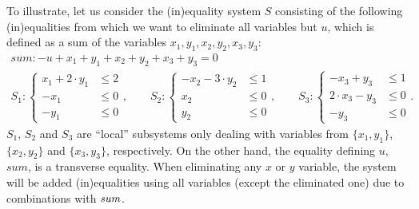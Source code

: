 \begin{example}\label{ex:1}
To illustrate, let us consider the (in)equality system $S$ consisting of the following (in)equalities from which we want to eliminate all variables but $u$, %
which is defined as a sum %
of the variables $x_1, y_1, x_2, y_2, x_3, y_3$:
\begin{gather*}
\mathit{sum}: -u + x_1 + y_1 + x_2 + y_2 + x_3 + y_3= 0\\
S_1: \left\{ \begin{array}{ll}x_1 + 2 \cdot y_1 &\leq 2\\
															 -x_1 &\leq 0\\
															 -y_1 &\leq 0\end{array}\right.,\qquad
S_2 : \left\{ \begin{array}{ll} -x_2 - 3\cdot y_2 &\leq 1\\
																 x_2 &\leq 0\\
																 y_2 &\leq 0\end{array}\right.,\qquad
S_3 : \left\{ \begin{array}{ll} -x_3 + y_3 &\leq 1\\
																 2\cdot x_3 - y_3 &\leq 0\\
																 -y_3 &\leq 0\end{array}\right..
\end{gather*}
$S_1$, $S_2$ and $S_3$ are ``local'' subsystems only dealing with variables from $\{x_1,y_1\}$, $\{x_2, y_2\}$ and $\{x_3,y_3\}$, respectively. On the other hand, the equality defining $u$, %
$\mathit{sum}$, %
is a transverse equality. When eliminating any $x$ or $y$ variable, the system will be added (in)equalities using all variables (except the eliminated one) due to combinations with $\mathit{sum}$. %


\end{example}
